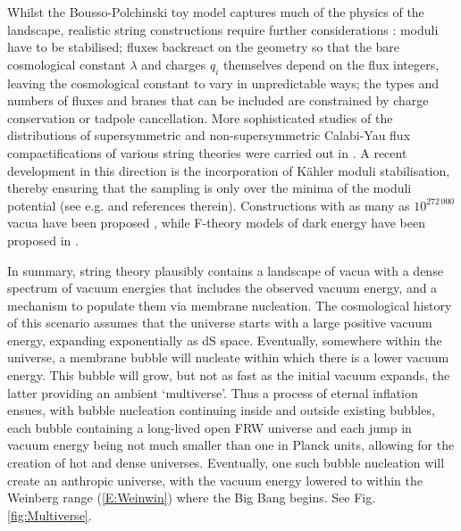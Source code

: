 Whilst the Bousso-Polchinski toy model captures much of the physics of the landscape, realistic string constructions require further considerations \cite{Denef:2007pq}: moduli have to be stabilised; fluxes backreact on the geometry so that the bare cosmological constant $\lambda$ and charges $q_i$ themselves depend on the flux integers, leaving the cosmological constant to vary in unpredictable ways; the types and numbers of fluxes and branes that can be included are constrained by charge conservation or tadpole cancellation.  More sophisticated studies of the distributions of supersymmetric and non-supersymmetric Calabi-Yau flux compactifications of various string theories were carried out in \cite{Denef:2004ze, Douglas:2003um, Ashok:2003gk, Dienes:2006ut}. A recent development in this direction is the incorporation of K\"ahler moduli stabilisation, thereby ensuring that the sampling is only over the minima of the moduli potential (see e.g. \cite{Broeckel:2020fdz, Cicoli:2022chj} and references therein). Constructions with as many as $10^{272\,000}$ vacua have been proposed \cite{Taylor:2015xtz}, while F-theory models of dark energy have been proposed in \cite{Heckman:2019dsj, Heckman:2018mxl}.

In summary, string theory plausibly contains a landscape of vacua with a dense spectrum of vacuum energies that includes the observed vacuum energy, and a mechanism to populate them via membrane nucleation. The cosmological history of this scenario assumes that the universe starts with a large positive vacuum energy, expanding exponentially as dS space.  Eventually, somewhere within the universe, a membrane bubble will nucleate within which there is a lower vacuum energy.  This bubble will grow, but not as fast as the initial vacuum expands, the latter providing an ambient `multiverse'. Thus a process of eternal inflation ensues, with bubble nucleation continuing inside and outside existing bubbles, each bubble containing a long-lived open FRW universe and each jump in vacuum energy being not much smaller than one in Planck units, allowing for the creation of hot and dense universes. Eventually, one such bubble nucleation will create an anthropic universe, with the vacuum energy lowered to within the Weinberg range (\ref{E:Weinwin}) where the Big Bang begins.  See Fig. \ref{fig:Multiverse}.


